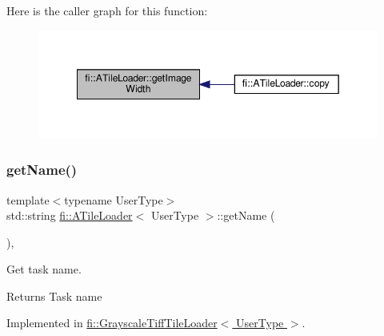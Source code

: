 Here is the caller graph for this function\+:
\nopagebreak
\begin{figure}[H]
\begin{center}
\leavevmode
\includegraphics[width=349pt]{dc/d54/classfi_1_1ATileLoader_ad775bcbdddf7da6bb3f857a53c075a86_icgraph}
\end{center}
\end{figure}
\mbox{\label{classfi_1_1ATileLoader_abb4cad235d57fbfb29ff5d37caf32a62}} 
\subsubsection{\texorpdfstring{get\+Name()}{getName()}}
{\footnotesize\ttfamily template$<$typename User\+Type$>$ \\
std\+::string \hyperlink{classfi_1_1ATileLoader}{fi\+::\+A\+Tile\+Loader}$<$ User\+Type $>$\+::get\+Name (\begin{DoxyParamCaption}{ }\end{DoxyParamCaption})\hspace{0.3cm}{\ttfamily [override]}, {}}



Get task name. 

\begin{DoxyReturn}{Returns}
Task name 
\end{DoxyReturn}


Implemented in \hyperlink{classfi_1_1GrayscaleTiffTileLoader_a66be68fc0c11aefbcb141ddb8c9e4deb}{fi\+::\+Grayscale\+Tiff\+Tile\+Loader$<$ User\+Type $>$}.

